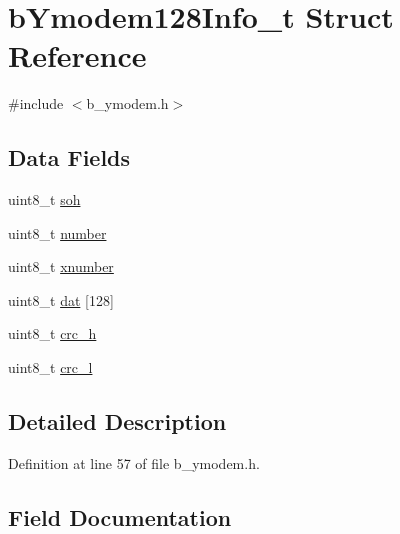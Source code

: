 \hypertarget{structb_ymodem128_info__t}{}\section{b\+Ymodem128\+Info\+\_\+t Struct Reference}
\label{structb_ymodem128_info__t}


{\ttfamily \#include $<$b\+\_\+ymodem.\+h$>$}

\subsection*{Data Fields}
\begin{DoxyCompactItemize}
\item 
uint8\+\_\+t \mbox{\hyperlink{structb_ymodem128_info__t_a87bdcb2d9de9c3eef834e0af26f2d5e3}{soh}}
\item 
uint8\+\_\+t \mbox{\hyperlink{structb_ymodem128_info__t_af57eaec6f3dec6de717735725c9908a6}{number}}
\item 
uint8\+\_\+t \mbox{\hyperlink{structb_ymodem128_info__t_ae817be61f4d69f01a76ff417b23f5a54}{xnumber}}
\item 
uint8\+\_\+t \mbox{\hyperlink{structb_ymodem128_info__t_ab02bda4989472488cf520fd11c64a230}{dat}} \mbox{[}128\mbox{]}
\item 
uint8\+\_\+t \mbox{\hyperlink{structb_ymodem128_info__t_a8b556a1f624d837372d1b7d09c747c8f}{crc\+\_\+h}}
\item 
uint8\+\_\+t \mbox{\hyperlink{structb_ymodem128_info__t_aac2e6315c9d2f111fa40efaf5135ca54}{crc\+\_\+l}}
\end{DoxyCompactItemize}


\subsection{Detailed Description}


Definition at line 57 of file b\+\_\+ymodem.\+h.



\subsection{Field Documentation}
\mbox{\label{structb_ymodem128_info__t_a8b556a1f624d837372d1b7d09c747c8f}} 
